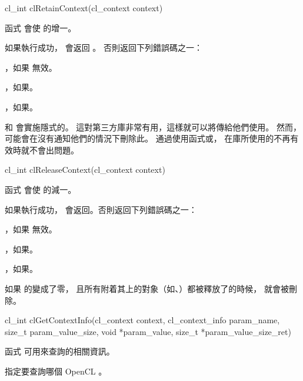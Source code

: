 
\startCLFUNC
cl_int clRetainContext(cl_context context)
\stopCLFUNC

函式  會使  的增一。

如果執行成功， 會返回 。
否則返回下列錯誤碼之一：
\startigBase
\item {}，如果  無效。

\item {}，如果\scdevfailres。

\item {}，如果\schostfailres。
\stopigBase

 和  會實施隱式的。
這對第三方庫非常有用，這樣就可以將傳給他們使用。
然而，可能會在沒有通知他們的情況下刪除此。
通過使用函式或，
在庫所使用的不再有效時就不會出問題。


\startCLFUNC
cl_int clReleaseContext(cl_context context)
\stopCLFUNC

函式  會使  的減一。

如果執行成功， 會返回。否則返回下列錯誤碼之一：
\startigBase
\item {}，如果  無效。
\item {}，如果\scdevfailres。
\item {}，如果\schostfailres。
\stopigBase

如果  的變成了零，
且所有附着其上的對象（如、）都被釋放了的時候，
 就會被刪除。


\startCLFUNC
cl_int clGetContextInfo(cl_context context,
		cl_context_info param_name,
		size_t param_value_size,
		void *param_value,
		size_t *param_value_size_ret)
\stopCLFUNC

函式  可用來查詢的相關資訊。

 指定要查詢哪個 OpenCL 。

